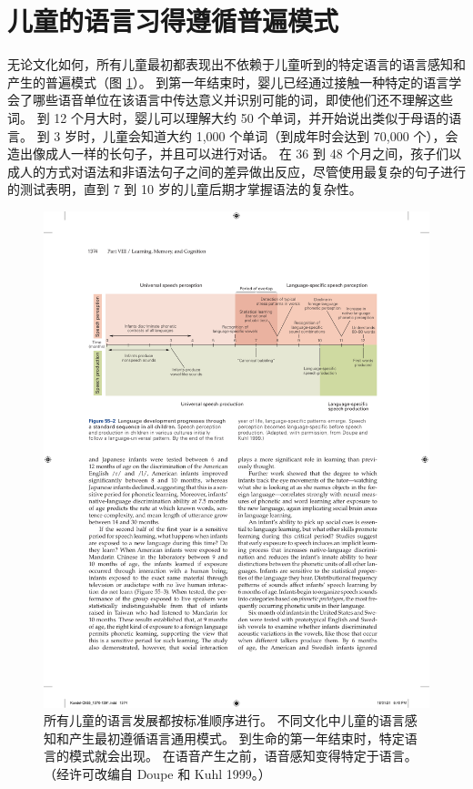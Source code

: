 \section{儿童的语言习得遵循普遍模式}
无论文化如何，所有儿童最初都表现出不依赖于儿童听到的特定语言的语言感知和产生的普遍模式（图 \ref{fig:55_2}）。 到第一年结束时，婴儿已经通过接触一种特定的语言学会了哪些语音单位在该语言中传达意义并识别可能的词，即使他们还不理解这些词。 到 12 个月大时，婴儿可以理解大约 50 个单词，并开始说出类似于母语的语言。 到 3 岁时，儿童会知道大约 1,000 个单词（到成年时会达到 70,000 个），会造出像成人一样的长句子，并且可以进行对话。 在 36 到 48 个月之间，孩子们以成人的方式对语法和非语法句子之间的差异做出反应，尽管使用最复杂的句子进行的测试表明，直到 7 到 10 岁的儿童后期才掌握语法的复杂性。

\begin{figure}[htbp]
	\centering
	\includegraphics[width=0.9\linewidth]{chap55/fig_55_2}
	\caption{所有儿童的语言发展都按标准顺序进行。 不同文化中儿童的语言感知和产生最初遵循语言通用模式。 到生命的第一年结束时，特定语言的模式就会出现。 在语音产生之前，语音感知变得特定于语言。 （经许可改编自 Doupe 和 Kuhl 1999。）}
	\label{fig:55_2}
\end{figure}

